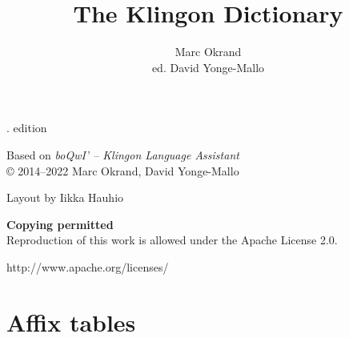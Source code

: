 \documentclass[10pt,a5paper,twoside]{book}
\title{The Klingon Dictionary}
\author{Marc Okrand\\ ed. David Yonge-Mallo}
\begin{document}
\frontmatter
\maketitle
\clearpage
\vspace*{\fill}
. edition
\vspace*{10pt}

\noindent
Based on \textit{boQwI' -- Klingon Language Assistant}\\
© 2014--2022 Marc Okrand, David Yonge-Mallo
\vspace*{10pt}

\noindent
Layout by Iikka Hauhio\\
\vspace*{10pt}

\noindent
\textbf{Copying permitted} \\
Reproduction of this work is allowed under the Apache License 2.0.

\noindent
http://www.apache.org/licenses/
\newpage

\tableofcontents
\newpage
\mainmatter



\fancyhead[L]{}
\fancyhead[R]{}

\newpage
\section{Affix tables}
\end{document}
